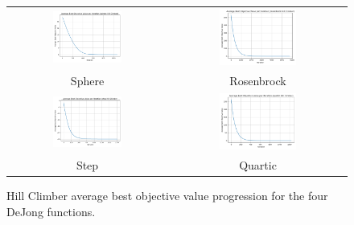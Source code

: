 \documentclass[11pt]{article}
\begin{document}
\begin{figure}[H]
    \centering
    \begin{tabular}{cc}
        \includegraphics[width=0.45\textwidth]{plots/sphere_hillclimber.png} &
        \includegraphics[width=0.45\textwidth]{plots/rosenbrock_hillclimber.png} \\
        Sphere & Rosenbrock \\
        \includegraphics[width=0.45\textwidth]{plots/step_hillclimber.png} &
        \includegraphics[width=0.45\textwidth]{plots/quartic_hillclimber.png} \\
        Step & Quartic \\
    \end{tabular}
    \caption{Hill Climber average best objective value progression for the four DeJong functions.}
    \label{fig:hc-plots}
\end{figure}
\clearpage
\end{document}
